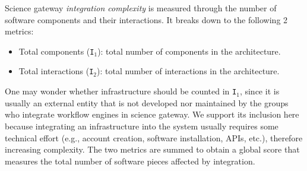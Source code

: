 \documentclass[preprint,3p,twocolumn]{elsarticle}
\newcommand{\note}[2]{\pdfmargincomment[color=yellow,author=#1,open=true]{#2}}
\newcommand{\closednote}[4]{} %
\begin{document}
\closednote{Sil}{i was wondering whether it would be more clear to present the metrics like this:
\item \texttt{I$_1$}: total number of components, and now the parenthesis are next to text that does not really match the metric definition (exception in this case) could also use boldface}{Tristan}{Fixed, following discussion in https://github.com/glatard/FGCS-works-special-issue/pull/20}
Science gateway \emph{integration complexity} is measured through the number of software components and their interactions. It breaks
down to the following 2 metrics:
\begin{itemize}[leftmargin=0cm,itemindent=0.35cm,itemsep=0cm]
\item Total components (\texttt{I$_1$}): total number of components in
  the architecture.
\item Total interactions (\texttt{I$_2$}): total number of
  interactions in the architecture.
\end{itemize}
One may wonder whether infrastructure should be counted in
\texttt{I$_1$}, since it is usually an external entity that is not developed nor maintained by the groups who
integrate workflow engines in science gateway. We support its inclusion here because integrating an
infrastructure into the system usually requires some technical
effort (e.g., account creation, software installation, APIs, etc.), therefore increasing complexity. The two metrics are summed to obtain a
global score that measures the
total number of software pieces affected by integration. 
\end{document}
